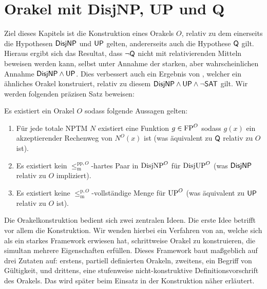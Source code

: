 \chapter{Orakel mit DisjNP, UP und Q}\label{chap:orakel}

Ziel dieses Kapitels ist die Konstruktion eines Orakels $O$, relativ zu dem einerseits die Hypothesen $\mathsf{DisjNP}$ und $\mathsf{UP}$ gelten, andererseits auch die Hypothese $\mathsf{Q}$ gilt.
Hieraus ergibt sich das Resultat, dass $\neg\mathsf{Q}$ nicht mit relativierenden Mitteln beweisen werden kann, selbst unter Annahme der starken, aber wahrscheinlichen Annahme $\mathsf{DisjNP}\land\mathsf{UP}$.
Dies verbessert auch ein Ergebnis von \textcite[Cor.~3.3]{dose_oracle_2020}, welcher ein ähnliches Orakel konstruiert, relativ zu diesem $\mathsf{DisjNP}\land\mathsf{UP}\land\neg\mathsf{SAT}$ gilt.
Wir werden folgenden präzisen Satz beweisen:

\begin{theorem}\label{thm:myoracle}
    Es existiert ein Orakel $O$ sodass folgende Aussagen gelten:
    \begin{enumerate}
        \item Für jede totale NPTM $N$ existiert eine Funktion $g\in\mathrm{FP}^O$ sodass $g(x)$ ein akzeptierender Rechenweg von $N^O(x)$ ist (was äquivalent zu $\mathsf{Q}$ relativ zu $O$ ist).
        \item Es existiert kein $\leq_\mathrm{m}^{\mathrm{pp},O}$-hartes Paar in $\mathrm{DisjNP}^O$ für $\mathrm{DisjUP}^O$ (was $\mathsf{DisjNP}$ relativ zu $O$ impliziert).
        \item Es existiert keine $\leq_\mathrm{m}^{\mathrm{p},O}$-vollständige Menge für $\mathrm{UP}^O$ (was äquivalent zu $\mathsf{UP}$ relativ zu $O$ ist).
    \end{enumerate}
\end{theorem}

Die Orakelkonstruktion bedient sich zwei zentralen Ideen. 
Die erste Idee betrifft vor allem die Konstruktion. 
Wir wenden hierbei ein Verfahren von \textcite{dose_np-completeness_2019} an, welche sich als ein starkes Framework erwiesen hat, schrittweise Orakel zu konstruieren, die simultan mehrere Eigenschaften erfüllen. Dieses Framework baut maßgeblich auf drei Zutaten auf: erstens, partiell definierten Orakeln, zweitens, ein Begriff von Gültigkeit, und drittens, eine stufenweise nicht-konstruktive Definitionsvorschrift des Orakels.
Das wird später beim Einsatz in der Konstruktion näher erläutert.

